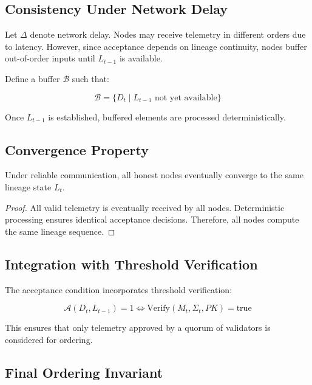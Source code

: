 \subsection{Consistency Under Network Delay}

Let $\Delta$ denote network delay. Nodes may receive telemetry in different orders due to latency. However, since acceptance depends on lineage continuity, nodes buffer out-of-order inputs until $L_{t-1}$ is available.

Define a buffer $\mathcal{B}$ such that:

\begin{equation}
\mathcal{B} = \{D_t \mid L_{t-1} \text{ not yet available}\}
\end{equation}

Once $L_{t-1}$ is established, buffered elements are processed deterministically.

\subsection{Convergence Property}

\begin{theorem}
Under reliable communication, all honest nodes eventually converge to the same lineage state $L_t$.
\end{theorem}

\begin{proof}
All valid telemetry is eventually received by all nodes. Deterministic processing ensures identical acceptance decisions. Therefore, all nodes compute the same lineage sequence.
\end{proof}

\subsection{Integration with Threshold Verification}

The acceptance condition incorporates threshold verification:

\begin{equation}
\mathcal{A}(D_t, L_{t-1}) = 1 \iff \text{Verify}(M_t, \Sigma_t, PK) = \text{true}
\end{equation}

This ensures that only telemetry approved by a quorum of validators is considered for ordering.

\subsection{Final Ordering Invariant}

